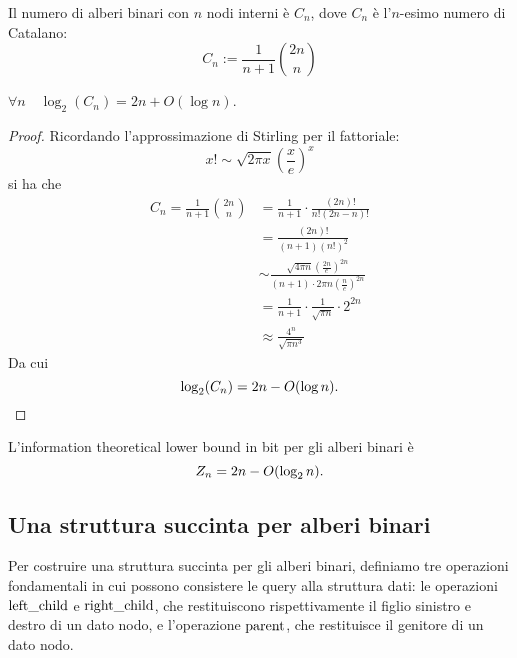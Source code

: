 \begin{theorem}\label{thm:catalano}
	Il numero di alberi binari con $n$ nodi interni è $C_n$, dove $C_n$ è l'$n$-esimo numero di Catalano:
	\begin{equation*}
		C_n := \frac{1}{n+1}\binom{2n}{n}
	\end{equation*}
\end{theorem}
\begin{corollario}
	$\forall n \quad\log_2(C_n)=2n+O(\log n)$.
\end{corollario}
\begin{proof}
	Ricordando l'approssimazione di Stirling per il fattoriale:
	\begin{equation*}
		x! \sim \sqrt{2\pi x} \left(\frac{x}{e}\right)^x
	\end{equation*}
	si ha che
	\begin{align*}
		C_n = \frac{1}{n+1}\binom{2n}{n} & = \frac{1}{n+1}\cdot\frac{(2n)!}{n!(2n-n)!}                                                             \\
		                                 & = \frac{(2n)!}{(n+1)(n!)^2}                                                                             \\
		                                 & \sim \frac{\sqrt{4\pi n}\left(\frac{2n}{e}\right)^{2n}}{(n+1)\cdot 2\pi n\left(\frac{n}{e}\right)^{2n}} \\
		                                 & = \frac{1}{n+1}\cdot \frac{1}{\sqrt{\pi n}}\cdot 2^{2n}                                                 \\
		                                 & \approx \frac{4^n}{\sqrt{\pi n^3}}
	\end{align*}
	Da cui
	\begin{equation*}
		\log_2(C_n) = 2n-O(\log n) \text.
	\end{equation*}
\end{proof}
\begin{corollario}\label{corol:bitree:itlb}
	L'information theoretical lower bound in bit per gli alberi binari è
	\begin{equation*}
		Z_n = 2n-O(\log_2 n) \text.
	\end{equation*}
\end{corollario}


\subsection{Una struttura succinta per alberi binari}
Per costruire una struttura succinta per gli alberi binari, definiamo tre operazioni fondamentali in cui possono consistere le query alla struttura dati: le operazioni $\mathrm{left\_child}$ e $\mathrm{right\_child}$, che restituiscono rispettivamente il figlio sinistro e destro di un dato nodo, e l'operazione $\mathrm{parent}$, che restituisce il genitore di un dato nodo.

